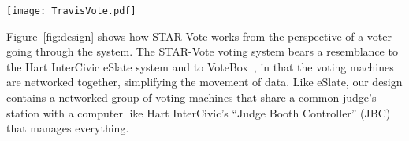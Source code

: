 \documentclass[letterpaper, 10pt, twocolumn]{article}
\newcommand{\projname}{STAR-Vote\xspace}
\begin{document}
\label{sec:voterflow}

\begin{figure*}
\texttt{[image: TravisVote.pdf]}
\caption{The design of the \projname system. Green objects are computers, white objects are paper records, and other objects are shaded in gray. Arrows display the flow of information; green for digital information, black for paper, and dashed lines indicate that the flow is contingent on voter choice.\label{fig:design}.}
\end{figure*}

Figure~\ref{fig:design} shows how \projname works from the perspective
of a voter going through the system. 
The \projname voting system bears a resemblance to the Hart InterCivic eSlate system and to VoteBox~\cite{sandler08votebox}, in that the voting machines are networked together, 
simplifying the movement of data. 
Like eSlate, our design contains a networked group of voting machines that share a common judge's station with a computer like Hart InterCivic's ``Judge Booth Controller'' (JBC) that manages everything. 
\end{document}

